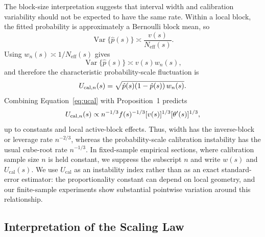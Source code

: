 \documentclass[11pt]{article}
\begin{document}
	The block-size interpretation suggests that interval width and calibration variability should not be expected to have the same rate. Within a local block, the fitted probability is approximately a Bernoulli block mean, so
	\begin{equation}
		\operatorname{Var}\{\hat p(s)\}
		\asymp
		\frac{v(s)}{N_{\mathrm{eff}}(s)}.
	\end{equation}
	Using $w_n(s)\asymp1/N_{\mathrm{eff}}(s)$ gives
	\begin{equation}
		\operatorname{Var}\{\hat p(s)\}
		\asymp
		v(s)w_n(s),
		\label{eq:variance_width_relation}
	\end{equation}
	and therefore the characteristic probability-scale fluctuation is
	\begin{equation}
		U_{{\rm cal},n}(s)
		=
		\sqrt{\hat p(s)(1-\hat p(s))\,w_n(s)}.
		\label{eq:ucal}
	\end{equation}
	Combining Equation~\ref{eq:ucal} with Proposition~1 predicts
	\begin{equation}
		U_{{\rm cal},n}(s)
		\propto
		n^{-1/3}f(s)^{-1/3}
		[v(s)]^{1/3}
		[\theta'(s)]^{1/3},
		\label{eq:ucal_scaling}
	\end{equation}
	up to constants and local active-block effects. Thus, width has the inverse-block or leverage rate $n^{-2/3}$, whereas the probability-scale calibration instability has the usual cube-root rate $n^{-1/3}$. In fixed-sample empirical sections, where calibration sample size $n$ is held constant, we suppress the subscript $n$ and write $w(s)$ and $U_{\mathrm{cal}}(s)$. We use $U_{\mathrm{cal}}$ as an instability index rather than as an exact standard-error estimator: the proportionality constant can depend on local geometry, and our finite-sample experiments show substantial pointwise variation around this relationship.
	
	\subsection{Interpretation of the Scaling Law}
	
\end{document}
